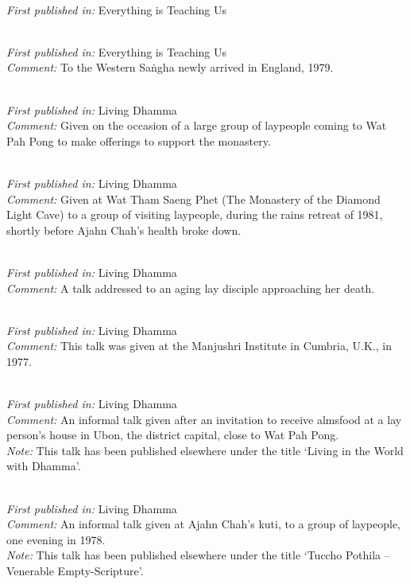 { \\
\textit{First published in:} Everything is Teaching Us

 \\
\textit{First published in:} Everything is Teaching Us \\
\textit{Comment:} To the Western Sa\.ngha newly arrived in England, 1979.

 \\
\textit{First published in:} Living Dhamma \\
\textit{Comment:} Given on the occasion of a large group of laypeople coming to Wat Pah Pong to make offerings to support the monastery.

 \\
\textit{First published in:} Living Dhamma \\
\textit{Comment:} Given at Wat Tham Saeng Phet (The Monastery of the Diamond Light Cave) to a group of visiting laypeople, during the rains retreat of 1981, shortly before Ajahn Chah's health broke down.

 \\
\textit{First published in:} Living Dhamma \\
\textit{Comment:} A talk addressed to an aging lay disciple approaching her death.

 \\
\textit{First published in:} Living Dhamma \\
\textit{Comment:} This talk was given at the Manjushri Institute in Cumbria, U.K., in 1977.

\clearpage

 \\
\textit{First published in:} Living Dhamma \\
\textit{Comment:} An informal talk given after an invitation to receive almsfood at a lay person's house in Ubon, the district capital, close to Wat Pah Pong. \\
\textit{Note:} This talk has been published elsewhere under the title `Living in the World with Dhamma'.

 \\
\textit{First published in:} Living Dhamma \\
\textit{Comment:} An informal talk given at Ajahn Chah's kuti, to a group of laypeople, one evening in 1978. \\
\textit{Note:} This talk has been published elsewhere under the title `Tuccho Pothila -- Venerable Empty-Scripture'.

}
